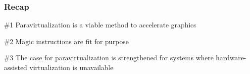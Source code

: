 \begin{frame}
\frametitle{Recap}

\begin{block}{\#1}
	Paravirtualization is a viable method to accelerate graphics
\end{block}

\begin{block}{\#2}
	Magic instructions are fit for purpose
\end{block}

\begin{block}{\#3}
	The case for paravirtualization is strengthened for systems where hardware-assisted virtualization is unavailable
\end{block}

\end{frame}
